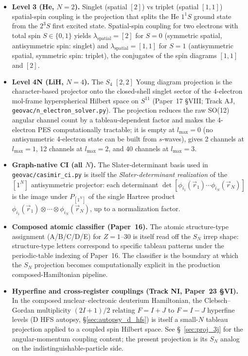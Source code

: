 \documentclass[11pt]{article}
\begin{document}
\begin{itemize}
\item \textbf{Level 3 (He, $N=2$).}  Singlet (spatial $[2]$) vs
triplet (spatial $[1,1]$) spatial-spin coupling is the projection that
splits the He $1^1 S$ ground state from the $2^3 S$ first excited
state.  Spatial-spin coupling for two electrons with total spin
$S \in \{0, 1\}$ yields $\lambda_\text{spatial} = [2]$ for $S=0$
(symmetric spatial, antisymmetric spin: singlet) and
$\lambda_\text{spatial} = [1,1]$ for $S=1$ (antisymmetric spatial,
symmetric spin: triplet), the conjugates of the spin diagrams
$[1,1]$ and $[2]$.
\item \textbf{Level 4N (LiH, $N=4$).}  The $S_4$ $[2,2]$ Young
diagram projection is the character-based projector onto the
closed-shell singlet sector of the 4-electron mol-frame
hyperspherical Hilbert space on $S^{11}$ (Paper~17 §VIII; Track AJ,
\texttt{geovac/n\_electron\_solver.py}).  The projection reduces the
raw SO(12) angular channel count by a tableau-dependent factor and
makes the 4-electron PES computationally tractable; it is empty at
$l_{\max} = 0$ (no antisymmetric 4-electron state can be built from
$s$-waves), gives 2 channels at $l_{\max} = 1$, 12 channels at
$l_{\max} = 2$, and 40 channels at $l_{\max} = 3$.
\item \textbf{Graph-native CI (all $N$).}  The Slater-determinant
basis used in \texttt{geovac/casimir\_ci.py} is itself the
\emph{Slater-determinant realization} of the $[1^N]$ antisymmetric
projector: each determinant
$\det[\phi_{i_1}(\vec{r}_1)\cdots\phi_{i_N}(\vec{r}_N)]$ is the
image under $P_{[1^N]}$ of the single Hartree product
$\phi_{i_1}(\vec{r}_1)\otimes\cdots\otimes\phi_{i_N}(\vec{r}_N)$,
up to a normalization factor.
\item \textbf{Composed atomic classifier (Paper~16).}  The atomic
structure-type assignment (A/B/C/D/E) for $Z = 1$--$30$ is itself
read off the $S_N$ irrep shape: structure-type letters correspond to
specific tableau patterns under the periodic-table indexing of
Paper~16.  The classifier is the boundary at
which the $S_N$ projection becomes computationally explicit in the
production composed-Hamiltonian pipeline.
\item \textbf{Hyperfine and cross-register couplings (Track NI,
Paper~23 §VI).}  In the composed nuclear--electronic deuterium
Hamiltonian, the Clebsch--Gordan multiplicity $(2I+1)/2$ relating
$F = I+J$ to $F = I-J$ hyperfine levels (D HFS autopsy,
\S\ref{sec:autopsy_d_hfs}) is itself a small-$N$ tableau projection
applied to a coupled spin Hilbert space.  See \S~\ref{sec:proj_3j}
for the angular-momentum coupling content; the present projection
is its $S_N$ analog on the indistinguishable-particle side.
\end{itemize}
\end{document}
